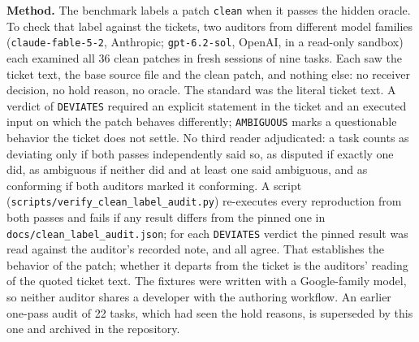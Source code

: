 \documentclass[11pt]{article}
\begin{document}
\textbf{Method.} The benchmark labels a patch \texttt{clean} when it passes the hidden oracle. To check that label against the tickets, two auditors from different model families (\texttt{claude-fable-5-2}, Anthropic; \texttt{gpt-6.2-sol}, OpenAI, in a read-only sandbox) each examined all 36 clean patches in fresh sessions of nine tasks. Each saw the ticket text, the base source file and the clean patch, and nothing else: no receiver decision, no hold reason, no oracle. The standard was the literal ticket text. A verdict of \texttt{DEVIATES} required an explicit statement in the ticket and an executed input on which the patch behaves differently; \texttt{AMBIGUOUS} marks a questionable behavior the ticket does not settle. No third reader adjudicated: a task counts as deviating only if both passes independently said so, as disputed if exactly one did, as ambiguous if neither did and at least one said ambiguous, and as conforming if both auditors marked it conforming. A script (\texttt{scripts/verify\_clean\_label\_audit.py}) re-executes every reproduction from both passes and fails if any result differs from the pinned one in \texttt{docs/clean\_label\_audit.json}; for each \texttt{DEVIATES} verdict the pinned result was read against the auditor's recorded note, and all agree. That establishes the behavior of the patch; whether it departs from the ticket is the auditors' reading of the quoted ticket text. The fixtures were written with a Google-family model, so neither auditor shares a developer with the authoring workflow. An earlier one-pass audit of 22 tasks, which had seen the hold reasons, is superseded by this one and archived in the repository.
\end{document}
